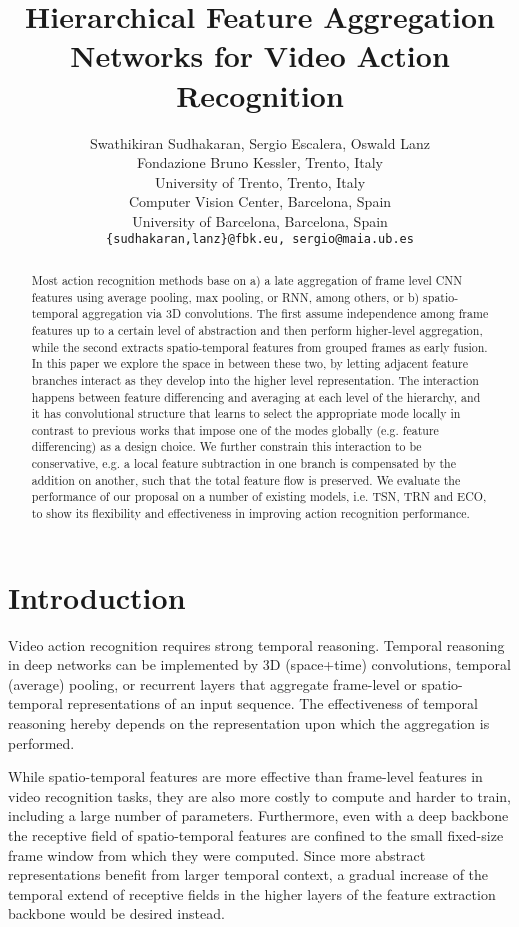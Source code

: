 \documentclass[journal,onecolumn]{IEEEtran}
\title{Hierarchical Feature Aggregation Networks for Video Action Recognition}
\author{Swathikiran Sudhakaran, Sergio Escalera, Oswald Lanz\\ 
	Fondazione Bruno Kessler, Trento, Italy\\
	University of Trento, Trento, Italy\\
	Computer Vision Center, Barcelona, Spain\\
	University of Barcelona, Barcelona, Spain\\
	{\tt\small \{sudhakaran,lanz\}@fbk.eu, \tt\small sergio@maia.ub.es}
}
\begin{document}
\maketitle

\begin{abstract}
	Most action recognition methods base on a) a late aggregation of frame level CNN features using average pooling, max pooling, or RNN, among others, or b) spatio-temporal aggregation via 3D convolutions. The first assume independence among frame features up to a certain level of abstraction and then perform higher-level aggregation, while the second extracts spatio-temporal features from grouped frames as early fusion. In this paper we explore the space in between these two, by letting adjacent feature branches interact as they develop into the higher level representation. The interaction happens between feature differencing and averaging at each level of the hierarchy, and it has convolutional structure that learns to select the appropriate mode locally in contrast to previous works that impose one of the modes globally (e.g. feature differencing) as a design choice. We further constrain this interaction to be conservative, e.g. a local feature subtraction in one branch is compensated by the addition on another, such that the total feature flow is preserved. We evaluate the performance of our proposal on a number of existing models, i.e. TSN, TRN and ECO, to show its flexibility and effectiveness in improving action recognition performance.
	
	


\end{abstract}

\section{Introduction}
\label{sec:intro}
Video action recognition requires strong temporal reasoning.
Temporal reasoning in deep networks can be implemented by 3D (space+time) convolutions, temporal (average) pooling, or recurrent layers that aggregate frame-level or spatio-temporal representations of an input sequence. The effectiveness of temporal reasoning hereby depends on the representation upon which the aggregation is performed. 

While spatio-temporal features are more effective than frame-level features in video recognition tasks, they are also more costly to compute and harder to train, including a large number of parameters. Furthermore, even with a deep backbone the receptive field of spatio-temporal features are confined to the small fixed-size frame window from which they were computed. Since more abstract representations benefit from larger temporal context, a gradual increase of the temporal extend of receptive fields in the higher layers of the feature extraction backbone would be desired instead.
\end{document}
